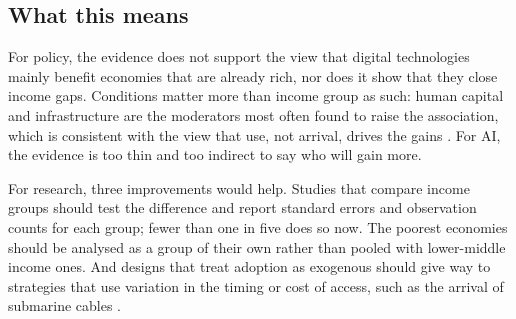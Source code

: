 \documentclass[11pt,a4paper]{article}
\begin{document}
\subsection{What this means}
For policy, the evidence does not support the view that digital technologies mainly benefit economies that are already rich, nor does it show that they close income gaps. Conditions matter more than income group as such: human capital and infrastructure are the moderators most often found to raise the association, which is consistent with the view that use, not arrival, drives the gains \cite{comin2018}. For AI, the evidence is too thin and too indirect to say who will gain more.

For research, three improvements would help. Studies that compare income groups should test the difference and report standard errors and observation counts for each group; fewer than one in five does so now. The poorest economies should be analysed as a group of their own rather than pooled with lower-middle income ones. And designs that treat adoption as exogenous should give way to strategies that use variation in the timing or cost of access, such as the arrival of submarine cables \cite{hjort2019}.
\end{document}

